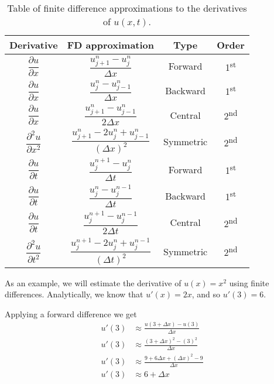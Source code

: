 \documentclass[twocolumn]{myarticle}
\begin{document}
\begin{table}
    \begin{tabular}{cccc}
        \toprule
        Derivative & FD approximation & Type & Order
        \\
        \midrule
        $ \dfrac{\partial u}{\partial x} $ & $ \dfrac{u^{n}_{j+1} - u^{n}_{j}}{\Delta x} $ & Forward & 1\textsuperscript{st} 
        \\[2.2ex]
        $ \dfrac{\partial u}{\partial x} $ & $ \dfrac{u^{n}_{j} - u^{n}_{j-1}}{\Delta x} $ & Backward & 1\textsuperscript{st}
        \\[2.2ex]
        $ \dfrac{\partial u}{\partial x} $ & $ \dfrac{u^{n}_{j+1} - u^{n}_{j-1}}{2 \Delta x} $ & Central & 2\textsuperscript{nd}
        \\[2.2ex]
        $ \dfrac{\partial^2 u}{\partial x^2} $ & $ \dfrac{u^{n}_{j+1} - 2 u^{n}_{j} + u^{n}_{j-1}}{(\Delta x)^2} $ & Symmetric & 2\textsuperscript{nd}
        \\[2.2ex]
        $ \dfrac{\partial u}{\partial t} $ & $ \dfrac{u^{n+1}_{j} - u^{n}_{j}}{\Delta t} $ & Forward & 1\textsuperscript{st}
        \\[2.2ex]
        $ \dfrac{\partial u}{\partial t} $ & $ \dfrac{u^{n}_{j} - u^{n-1}_{j}}{\Delta t} $ & Backward & 1\textsuperscript{st}
        \\[2.2ex]
        $ \dfrac{\partial u}{\partial t} $ & $ \dfrac{u^{n+1}_{j} - u^{n-1}_{j}}{2\Delta t} $ & Central & 2\textsuperscript{nd}
        \\[2.2ex]
        $ \dfrac{\partial^2 u}{\partial t^2} $ & $ \dfrac{u^{n+1}_{j} - 2 u^{n}_{j} + u^{n-1}_{j}}{(\Delta t)^2} $ & Symmetric & 2\textsuperscript{nd}
        \\[2.2ex]
        \bottomrule
    \end{tabular}
    \caption{Table of finite difference approximations to the derivatives of $ u(x,t) $.}
    \label{tab:finite_difference}
\end{table}

As an example, we will estimate the derivative of $ u(x) = x^2 $ using finite differences.
Analytically, we know that $ u'(x) = 2x $, and so $ u'(3) = 6 $.

Applying a forward difference we get
\begin{align}
    u'(3) &\approx \frac{u(3 + \Delta x) - u(3)}{\Delta x}
    \\
    u'(3) &\approx \frac{(3 + \Delta x)^2 - (3)^2}{\Delta x}
    \\
    u'(3) &\approx \frac{9 + 6 \Delta x + (\Delta x)^2 - 9}{\Delta x}
    \\
    u'(3) &\approx 6 + \Delta x
\end{align}
\end{document}
